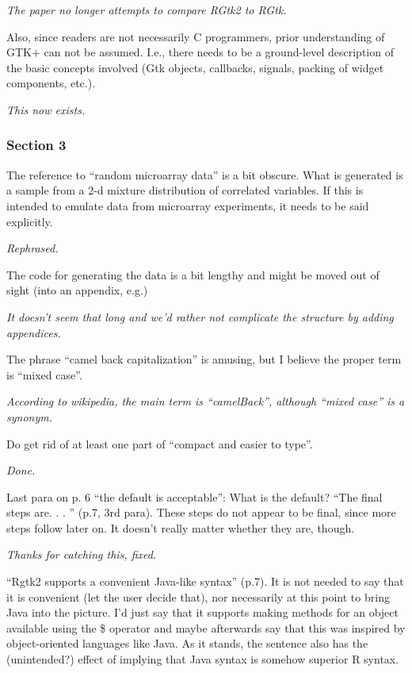\documentclass{article}
\begin{document}
\emph{The paper no longer attempts to compare RGtk2 to RGtk.}

Also, since readers are not necessarily C programmers,
prior understanding of GTK+ can not be assumed. I.e., there needs to be a
ground-level description of the basic concepts involved (Gtk objects, callbacks,
signals, packing of widget components, etc.).

\emph{This now exists.}

\subsubsection*{Section 3}

The reference to ``random microarray data'' is a bit obscure. What is generated
is a sample from a 2-d mixture distribution of correlated variables. If this
is intended to emulate data from microarray experiments, it needs to be said
explicitly. 

\emph{Rephrased.}

The code for generating the data is a bit lengthy and might be moved
out of sight (into an appendix, e.g.)

\emph{It doesn't seem that long and we'd rather not complicate the structure
by adding appendices.}

The phrase ``camel back capitalization'' is amusing, but I believe the proper
term is ``mixed case''. 

\emph{According to wikipedia, the main term is ``camelBack'', although
``mixed case'' is a synonym.}

Do get rid of at least one part of ``compact and easier to type''.

\emph{Done.}

Last para on p. 6 ``the default is acceptable'': What is the default?
``The final steps are. . . '' (p.7, 3rd para). These steps do not appear to be final,
since more steps follow later on. It doesn't really matter whether they are,
though.

\emph{Thanks for catching this, fixed.}

``Rgtk2 supports a convenient Java-like syntax'' (p.7). It is not needed to say
that it is convenient (let the user decide that), nor necessarily at this point to
bring Java into the picture. I'd just say that it supports making methods for an
object available using the \$ operator and maybe afterwards say that this was
inspired by object-oriented languages like Java. As it stands, the sentence also
has the (unintended?) effect of implying that Java syntax is somehow superior
R syntax.
\end{document}
